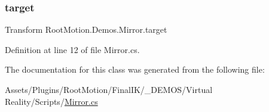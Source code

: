 \subsubsection{\texorpdfstring{target}{target}}
{\footnotesize\ttfamily Transform Root\+Motion.\+Demos.\+Mirror.\+target}



Definition at line 12 of file Mirror.\+cs.



The documentation for this class was generated from the following file\+:\begin{DoxyCompactItemize}
\item 
Assets/\+Plugins/\+Root\+Motion/\+Final\+I\+K/\+\_\+\+D\+E\+M\+O\+S/\+Virtual Reality/\+Scripts/\mbox{\hyperlink{_mirror_8cs}{Mirror.\+cs}}\end{DoxyCompactItemize}
